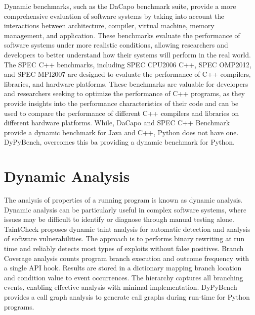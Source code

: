Dynamic benchmarks, such as the DaCapo benchmark suite, provide a more comprehensive evaluation of software systems by taking into account the interactions between architecture, compiler, virtual machine, memory management, and application. These benchmarks evaluate the performance of software systems under more realistic conditions, allowing researchers and developers to better understand how their systems will perform in the real world. \cite{DaCapo_2006}
The SPEC C++ benchmarks, including SPEC CPU2006 C++, SPEC OMP2012, and SPEC MPI2007 are designed to evaluate the performance of C++ compilers, libraries, and hardware platforms. These benchmarks are valuable for developers and researchers seeking to optimize the performance of C++ programs, as they provide insights into the performance characteristics of their code and can be used to compare the performance of different C++ compilers and libraries on different hardware platforms. \cite{SPEC_C++_2006, SPEC_OMP_2012, SPEC_MPI_2007}
While, DaCapo and SPEC C++ Benchmark provide a dynamic benchmark for Java and C++, Python does not have one. DyPyBench, overcomes this ba providing a dynamic benchmark for Python.    

\section{Dynamic Analysis}
The analysis of properties of a running program is known as dynamic analysis.\cite{Ball_1999}
Dynamic analysis can be particularly useful in complex software systems, where issues may be difficult to identify or diagnose through manual testing alone.
\cite{dynamic_analysis}
TaintCheck proposes dynamic taint analysis for automatic detection and analysis of software vulnerabilities. The approach is to performs binary rewriting at run time and reliably detects most types of exploits without false positives.\cite{newsome2005dynamic}
Branch Coverage analysis counts program branch execution and outcome frequency with a single API hook. Results are stored in a dictionary mapping branch location and condition value to event occurrences. The hierarchy captures all branching events, enabling effective analysis with minimal implementation.\cite{DynaPyt2022}
DyPyBench provides a call graph analysis to generate call graphs during run-time for Python programs. 

